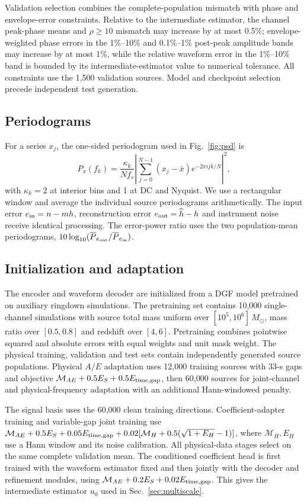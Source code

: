 \documentclass[10pt,prd,aps,a4paper,twocolumn,superscriptaddress,nofootinbib,floatfix]{revtex4-2}
\begin{document}
Validation selection combines the complete-population mismatch with phase and envelope-error constraints. Relative to the intermediate estimator, the channel peak-phase means and $\rho\ge10$ mismatch may increase by at most 0.5\%; envelope-weighted phase errors in the 1\%--10\% and 0.1\%--1\% post-peak amplitude bands may increase by at most 1\%, while the relative waveform error in the 1\%--10\% band is bounded by its intermediate-estimator value to numerical tolerance. All constraints use the 1,500 validation sources. Model and checkpoint selection precede independent test generation.

\subsection{Periodograms}
For a series $x_j$, the one-sided periodogram used in Fig.~\ref{fig:psd} is
\begin{equation}
P_x(f_k)=\frac{\kappa_k}{Nf_s}\left|\sum_{j=0}^{N-1}(x_j-\bar x)e^{-2\pi i jk/N}\right|^2,
\end{equation}
with $\kappa_k=2$ at interior bins and 1 at DC and Nyquist. We use a rectangular window and average the individual source periodograms arithmetically. The input error $e_{\rm in}=n-mh$, reconstruction error $e_{\rm out}=\widehat h-h$ and instrument noise receive identical processing. The error-power ratio uses the two population-mean periodograms, $10\log_{10}(\overline P_{e_{\rm out}}/\overline P_{e_{\rm in}})$.

\subsection{Initialization and adaptation}\label{app:initialization}
The encoder and waveform decoder are initialized from a DGF model pretrained on auxiliary ringdown simulations. The pretraining set contains 10,000 single-channel simulations with source total mass uniform over $[10^5,10^6]\,M_\odot$, mass ratio over $[0.5,0.8]$ and redshift over $[4,6]$. Pretraining combines pointwise squared and absolute errors with equal weights and unit mask weight. The physical training, validation and test sets contain independently generated source populations. Physical $A/E$ adaptation uses 12,000 training sources with 33-s gaps and objective $\mathcal M_{AE}+0.5E_S+0.5E_{\rm time,gap}$, then 60,000 sources for joint-channel and physical-frequency adaptation with an additional Hann-windowed penalty.

The signal basis uses the 60,000 clean training directions. Coefficient-adapter training and variable-gap joint training use $\mathcal M_{AE}+0.5E_S+0.05E_{\rm time,gap}+0.02[\mathcal M_H+0.5(\sqrt{1+E_H}-1)]$, where $\mathcal M_H,E_H$ use a Hann window and its noise calibration. All physical-data stages select on the same complete validation mean. The conditioned coefficient head is first trained with the waveform estimator fixed and then jointly with the decoder and refinement modules, using $\mathcal M_{AE}+0.2E_S+0.02E_{\rm time,gap}$. This gives the intermediate estimator $u_0$ used in Sec.~\ref{sec:multiscale}.
\end{document}
